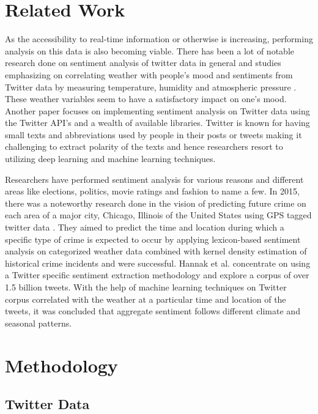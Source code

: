 \documentclass[a4paper,10pt]{article}
\begin{document}
    \section{Related Work}

    As the accessibility to real-time information or otherwise is increasing, performing analysis on this data is also becoming viable. There has been a lot of notable research done on sentiment analysis of twitter data in general and studies emphasizing on correlating weather with people’s mood and sentiments from Twitter data by measuring temperature, humidity and atmospheric pressure . These weather variables seem to have a satisfactory impact on one’s mood. Another paper  focuses on implementing sentiment analysis on Twitter data using the Twitter API’s and a wealth of available libraries. Twitter is known for having small texts and abbreviations used by people in their posts or tweets making it challenging to extract polarity of the texts and hence researchers resort to utilizing deep learning and machine learning techniques.
    
    Researchers have performed sentiment analysis for various reasons and different areas like elections, politics, movie ratings and fashion to name a few. In 2015, there was a noteworthy research done in the vision of predicting future crime on each area of a major city, Chicago, Illinois of the United States using GPS tagged twitter data . They aimed to predict the time and location during which a specific type of crime is expected to occur by applying lexicon-based sentiment analysis on categorized weather data combined with kernel density estimation of historical crime incidents and were successful. Hannak et al.  concentrate on using a Twitter specific sentiment extraction methodology and explore a corpus of over 1.5 billion tweets. With the help of machine learning techniques on Twitter corpus correlated with the weather at a particular time and location of the tweets, it was concluded that aggregate sentiment follows different climate and seasonal patterns.

    \section{Methodology}

    \subsection{Twitter Data}
\end{document}
